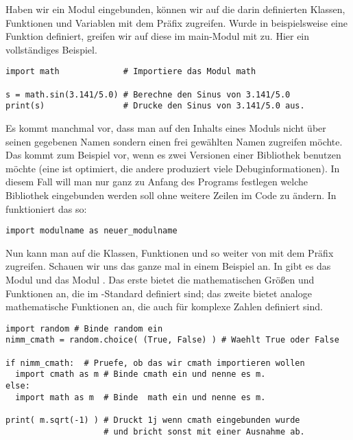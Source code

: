 Haben wir ein Modul  eingebunden, können wir auf die darin definierten Klassen, Funktionen und Variablen mit dem Präfix  zugreifen.
Wurde in  beispielsweise eine Funktion  definiert, greifen wir auf diese im main-Modul mit  zu.
Hier ein vollständiges Beispiel.
\begin{lstlisting}
import math             # Importiere das Modul math

s = math.sin(3.141/5.0) # Berechne den Sinus von 3.141/5.0
print(s)                # Drucke den Sinus von 3.141/5.0 aus.
\end{lstlisting}

Es kommt manchmal vor, dass man auf den Inhalts eines Moduls nicht über seinen gegebenen Namen sondern einen frei gewählten Namen zugreifen möchte.
Das kommt zum Beispiel vor, wenn es zwei Versionen einer Bibliothek benutzen möchte (eine ist optimiert, die andere produziert viele Debuginformationen).
In diesem Fall will man nur ganz zu Anfang des Programs festlegen welche Bibliothek eingebunden werden soll ohne weitere Zeilen im Code zu ändern.
In \Python funktioniert das so:
\begin{lstlisting}
import modulname as neuer_modulname
\end{lstlisting}
Nun kann man auf die Klassen, Funktionen und so weiter von  mit dem Präfix  zugreifen.
Schauen wir uns das ganze mal in einem Beispiel an.
In \Python gibt es das Modul  und das Modul .
Das erste bietet die mathematischen Größen und Funktionen an, die im \C-Standard definiert sind;
das zweite bietet analoge mathematische Funktionen an, die auch für komplexe Zahlen definiert sind.
\begin{lstlisting}
import random # Binde random ein
nimm_cmath = random.choice( (True, False) ) # Waehlt True oder False

if nimm_cmath:  # Pruefe, ob das wir cmath importieren wollen
  import cmath as m # Binde cmath ein und nenne es m.
else:
  import math as m  # Binde  math ein und nenne es m.

print( m.sqrt(-1) ) # Druckt 1j wenn cmath eingebunden wurde
                    # und bricht sonst mit einer Ausnahme ab.
\end{lstlisting}

